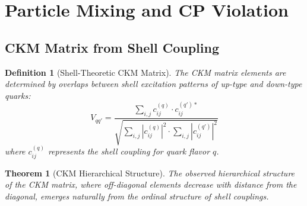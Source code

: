 \documentclass[12pt,a4paper]{article}
\newtheorem{theorem}{Theorem}[section]
\newtheorem{definition}{Definition}[section]
\begin{document}
\section{Particle Mixing and CP Violation}
\label{sec:mixing-cp-violation}

\subsection{CKM Matrix from Shell Coupling}
\label{subsec:ckm-matrix}

\begin{definition}[Shell-Theoretic CKM Matrix]
\label{def:ckm-matrix}
The CKM matrix elements are determined by overlaps between shell excitation patterns of up-type and down-type quarks:
\begin{equation}
V_{qq'} = \frac{\sum_{i,j} c_{ij}^{(q)} \cdot c_{ij}^{(q')*}}{\sqrt{\sum_{i,j} |c_{ij}^{(q)}|^2 \cdot \sum_{i,j} |c_{ij}^{(q')}|^2}}
\end{equation}
where $c_{ij}^{(q)}$ represents the shell coupling for quark flavor $q$.
\end{definition}

\begin{theorem}[CKM Hierarchical Structure]
\label{thm:ckm-hierarchy}
The observed hierarchical structure of the CKM matrix, where off-diagonal elements decrease with distance from the diagonal, emerges naturally from the ordinal structure of shell couplings.
\end{theorem}
\end{document}
